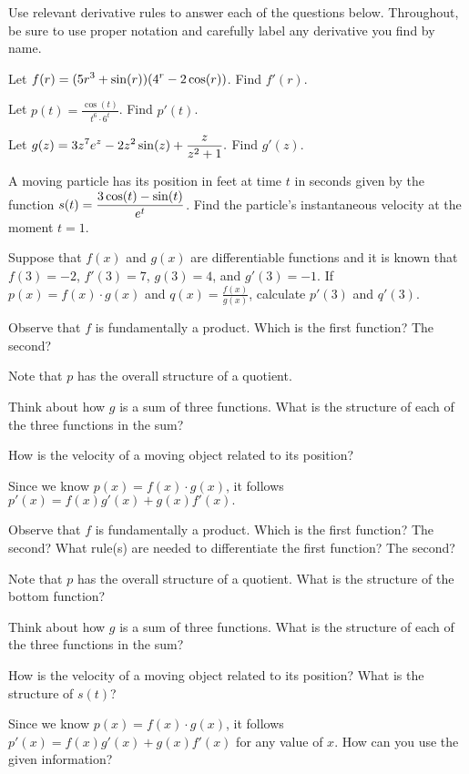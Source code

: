 \begin{activity} \label{A:2.5.3} Use relevant derivative rules to answer each of the questions below.  Throughout, be sure to use proper notation and carefully label any derivative you find by name.  
\ba
	\item Let $\displaystyle f(r) = (5r^3 + \sin(r))(4^r - 2\cos(r))$.  Find $f'(r)$.  
	\item Let $\displaystyle p(t) = \frac{\cos(t)}{t^6 \cdot 6^t}$.  Find $p'(t)$.
	\item Let $\displaystyle g(z) = 3z^7 e^z - 2z^2 \sin(z) + \frac{z}{z^2 + 1}.$  Find $g'(z)$.
	\item A moving particle has its position in feet at time $t$ in seconds given by the function $\displaystyle s(t) = \frac{3\cos(t) - \sin(t)}{e^t}$.  Find the particle's instantaneous velocity at the moment $t = 1$.
	\item Suppose that $f(x)$ and $g(x)$ are differentiable functions and it is known that $f(3) = -2$, $f'(3) = 7$, $g(3) = 4$, and  $g'(3) = -1$.  If $p(x) = f(x) \cdot g(x)$ and $\displaystyle q(x) = \frac{f(x)}{g(x)}$, calculate $p'(3)$ and $q'(3)$.
\ea
\end{activity}
\begin{smallhint}
\ba
	\item Observe that $f$ is fundamentally a product.  Which is the first function?  The second?  
	\item Note that $p$ has the overall structure of a quotient.
	\item Think about how $g$ is a sum of three functions.  What is the structure of each of the three functions in the sum?
	\item How is the velocity of a moving object related to its position?
	\item Since we know $p(x) = f(x) \cdot g(x)$, it follows $p'(x) = f(x) g'(x) + g(x) f'(x).$
\ea
\end{smallhint}
\begin{bighint}
\ba
	\item Observe that $f$ is fundamentally a product.  Which is the first function?  The second?  What rule(s) are needed to differentiate the first function?  The second? 
	\item Note that $p$ has the overall structure of a quotient.  What is the structure of the bottom function?
	\item Think about how $g$ is a sum of three functions.  What is the structure of each of the three functions in the sum?
	\item How is the velocity of a moving object related to its position?  What is the structure of $s(t)$?
	\item Since we know $p(x) = f(x) \cdot g(x)$, it follows $p'(x) = f(x) g'(x) + g(x) f'(x)$ for any value of $x$.  How can you use the given information?
\ea
\end{bighint}
